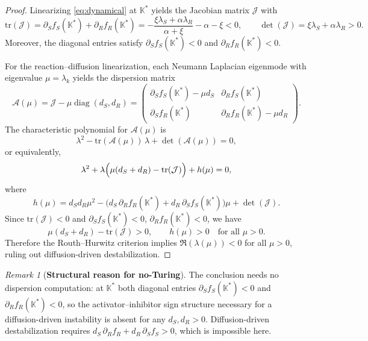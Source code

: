 \documentclass[pdflatex,sn-mathphys-ay]{sn-jnl}
\theoremstyle{thmstyleone}
\theoremstyle{definition}
\theoremstyle{remark}
\newtheorem{remark}[theorem]{Remark}
\begin{document}
\begin{proof}
Linearizing \eqref{eq:dynamical} at $\mathbb{K}^*$ yields the Jacobian matrix $\mathcal{J}$ with
\[
\mathrm{tr}(\mathcal{J})
=\partial_S f_S(\mathbb{K}^*)+\partial_R f_R(\mathbb{K}^*)
=-\frac{\xi\lambda_S+\alpha\lambda_R}{\alpha+\xi}-\alpha-\xi<0,
\qquad
\det(\mathcal{J})=\xi\lambda_S+\alpha\lambda_R>0.
\]
Moreover, the diagonal entries satisfy $\partial_S f_S(\mathbb{K}^*)<0$ and $\partial_R f_R(\mathbb{K}^*)<0$.

For the reaction--diffusion linearization, each Neumann Laplacian eigenmode with eigenvalue $\mu=\lambda_k$ yields the dispersion matrix
\[
\mathcal{A}(\mu) = \mathcal{J} - \mu \operatorname{diag}(d_S,d_R)
= \begin{pmatrix}
    \partial_S f_S(\mathbb{K}^*)-\mu d_S & \partial_Rf_S(\mathbb{K}^*) \\[4pt]
    \partial_S f_R(\mathbb{K}^*) & \partial_Rf_R(\mathbb{K}^*)-\mu d_R
\end{pmatrix}.
\]
The characteristic polynomial for $\mathcal{A}(\mu)$ is
\[
\lambda^2-\mathrm{tr}(\mathcal{A}(\mu))\,\lambda+\det(\mathcal{A}(\mu))=0,
\]
or equivalently,
\[
\lambda^2+\lambda\Bigl(\mu(d_S+d_R)-\mathrm{tr}(\mathcal{J})\Bigr)+h(\mu)=0,
\]
where
\[
h(\mu)=d_Sd_R\mu^2-\bigl(d_S\,\partial_R f_R(\mathbb{K}^*)+d_R\,\partial_S f_S(\mathbb{K}^*)\bigr)\mu+\det(\mathcal{J}).
\]
Since $\mathrm{tr}(\mathcal{J})<0$ and $\partial_S f_S(\mathbb{K}^*)<0$, $\partial_R f_R(\mathbb{K}^*)<0$, we have
\[
\mu(d_S+d_R)-\mathrm{tr}(\mathcal{J})>0,
\qquad 
h(\mu)>0
\quad \text{for all }\mu>0.
\]
Therefore the Routh--Hurwitz criterion implies $\Re(\lambda(\mu))<0$ for all $\mu>0$, ruling out diffusion-driven destabilization.
\end{proof}

\begin{remark}[\textbf{Structural reason for no-Turing}]
\label{rmk:sign_structure}
The conclusion needs no dispersion computation: at $\mathbb K^*$ both diagonal
entries $\partial_S f_S(\mathbb K^*)<0$ and $\partial_R f_R(\mathbb K^*)<0$, so the
activator--inhibitor sign structure necessary for a diffusion-driven instability
is absent for any $d_S,d_R>0$. Diffusion-driven destabilization requires
$d_S\,\partial_R f_R+d_R\,\partial_S f_S>0$, which is impossible here.
\end{remark}
\end{document}
